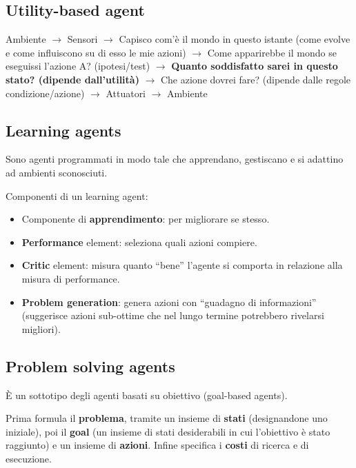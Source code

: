 \subsection{Utility-based agent}

Ambiente $\rightarrow$ Sensori $\rightarrow$ Capisco com'è il mondo in questo
istante (come evolve e come influiscono su di esso le mie azioni)
$\rightarrow$ Come apparirebbe il mondo se eseguissi l'azione A? (ipotesi/test)
$\rightarrow$ \textbf{Quanto soddisfatto sarei in questo stato?
(dipende dall'utilità)} $\rightarrow$ Che azione dovrei fare?
(dipende dalle regole condizione/azione) $\rightarrow$ Attuatori
$\rightarrow$ Ambiente

\subsection{Learning agents}

Sono agenti programmati in modo tale che apprendano, gestiscano e si adattino
ad ambienti sconosciuti.

Componenti di un learning agent:

\begin{itemize}
 \item Componente di \textbf{apprendimento}: per migliorare se stesso.
 \item \textbf{Performance} element: seleziona quali azioni compiere.
 \item \textbf{Critic} element: misura quanto ``bene'' l'agente si
comporta in relazione alla misura di performance.
 \item \textbf{Problem generation}: genera azioni con ``guadagno di
informazioni'' (suggerisce azioni sub-ottime che nel lungo
termine potrebbero rivelarsi migliori).
\end{itemize}

\subsection{Problem solving agents}

È un sottotipo degli agenti basati su obiettivo (goal-based agents).

Prima formula il \textbf{problema}, tramite un insieme di \textbf{stati}
(designandone uno iniziale), poi il \textbf{goal} (un insieme di stati
desiderabili in cui l'obiettivo è stato raggiunto) e un insieme di
\textbf{azioni}.
Infine specifica i \textbf{costi} di ricerca e di esecuzione. \\

